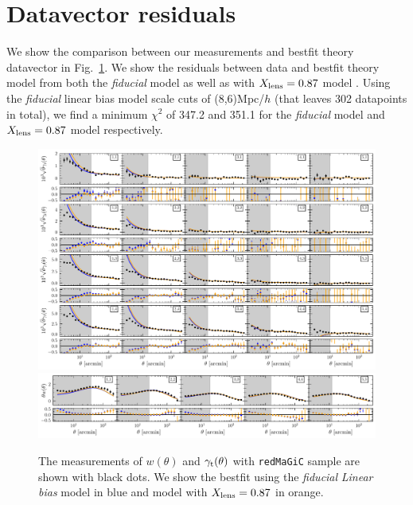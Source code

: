 \documentclass[aps, prd,twocolumn,superscriptaddress,nofootinbib,preprintnumbers]{revtex4-1}
\newcommand{\gammat}{\ensuremath{\gamma_{\rm t}(\theta)}}
\newcommand{\wtheta}{\ensuremath{w(\theta)}}
\newcommand{\redmagic}{\texttt{redMaGiC} }
\newcommand{\IR}[1]{{\color{red}[\textbf{Note for IR}: #1]}}
\begin{document}
\section{Datavector residuals}
We show the comparison between our measurements and bestfit theory datavector in Fig.~\ref{fig:data_2pt}. We show the residuals between data and bestfit theory model from both the \textit{fiducial} model as well as with $X_{\rm lens}=0.87$ model . Using the \textit{fiducial} linear bias model scale cuts of (8,6)Mpc/$h$ (that leaves 302 datapoints in total), we find a minimum $\chi^2$ of 347.2 and 351.1 for the \textit{fiducial} model and $X_{\rm lens}=0.87$ model respectively. 

\begin{figure}
\includegraphics[width=\textwidth]{figs/gt_wx_data.pdf}
\includegraphics[width=\textwidth]{figs/wt_wx_data.pdf}
\caption[]{The measurements of $\wtheta$ and $\gammat$ with \redmagic sample are shown with black dots. We show the bestfit using the \textit{fiducial} \textit{Linear bias} model in blue and model with $X_{\rm lens}=0.87$ in orange.  }
\label{fig:data_2pt}
\end{figure}
\end{document}
